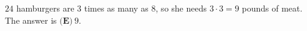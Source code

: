 $24$ hamburgers are $3$ times as many as $8$, so she needs $3\cdot3=9$ pounds of meat. The answer is $\boxed{\textbf{(E)}\ 9}$.
